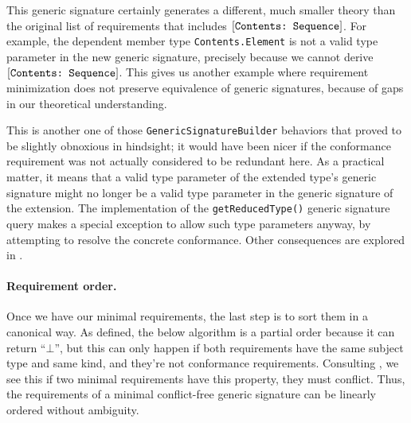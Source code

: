 \documentclass[../generics]{subfiles}
\begin{document}
This generic signature certainly generates a different, much smaller theory than the original list of requirements that includes $[\texttt{Contents:~Sequence}]$. For example, the dependent member type \texttt{Contents.Element} is not a valid type parameter in the new generic signature, precisely because we cannot derive $[\texttt{Contents:~Sequence}]$. This gives us another example where requirement minimization does not preserve equivalence of generic signatures, because of gaps in our theoretical understanding.

This is another one of those \texttt{GenericSignatureBuilder} behaviors that proved to be slightly obnoxious in hindsight; it would have been nicer if the conformance requirement was not actually considered to be redundant here. As a practical matter, it means that a valid type parameter of the extended type's generic signature might no longer be a valid type parameter in the generic signature of the extension. The implementation of the \texttt{getReducedType()} generic signature query makes a special exception to allow such type parameters anyway, by attempting to resolve the concrete conformance. Other consequences are explored in .

\paragraph{Requirement order.}
Once we have our minimal requirements, the last step is to sort them in a canonical way. As defined, the below algorithm is a partial order because it can return ``$\bot$'', but this can only happen if both requirements have the same subject type and same kind, and they're not conformance requirements. Consulting , we see this if two minimal requirements have this property, they must conflict. Thus, the requirements of a minimal conflict-free generic signature can be linearly ordered without ambiguity.
\end{document}
